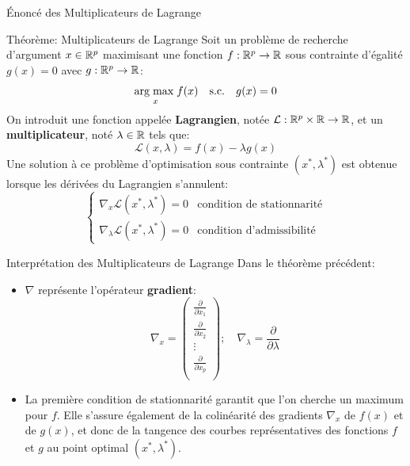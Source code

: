 \begin{frame}{\'Enoncé des Multiplicateurs de Lagrange}
	\begin{block}{Théorème: Multiplicateurs de Lagrange}
		Soit un problème de recherche d'argument $x \in \mathbb{R}^p$ maximisant une fonction $f: \mathbb{R}^p \to \mathbb{R}$ sous contrainte d'égalité $g(x) = 0$ avec $g: \mathbb{R}^p \to \mathbb{R}$:
		\begin{equation}
			\underset{x}{\operatorname{arg\;max}\;}f(x) \quad \text{s.c.} \quad g(x) = 0
			\nonumber
		\end{equation}
		On introduit une fonction appelée \textbf{Lagrangien}, notée $\mathcal{L}: \mathbb{R}^p \times \mathbb{R} \to \mathbb{R}$, et un \textbf{multiplicateur}, noté $\lambda \in \mathbb{R}$ tels que:
		\begin{equation}
			\mathcal{L}(x, \lambda) = f(x) - \lambda g(x)
			\nonumber
		\end{equation}
		Une solution à ce problème d'optimisation sous contrainte $(x^*, \lambda^*)$ est obtenue lorsque les dérivées du Lagrangien s'annulent:
		\begin{equation}
			\begin{cases}
				\nabla_x \mathcal{L}(x^*, \lambda^*) = 0          & \text{condition de stationnarité} \\
				\nabla_{\lambda} \mathcal{L}(x^*, \lambda^*) = 0  & \text{condition d'admissibilité}
				\nonumber
			\end{cases}
		\end{equation}
	\end{block}
\end{frame}

\begin{frame}{Interprétation des Multiplicateurs de Lagrange}
	Dans le théorème précédent:
	\begin{itemize}
		\item $\nabla$ représente l'opérateur \textbf{gradient}:
		\begin{equation}
			\nabla_x = \begin{pmatrix}
				\frac{\partial}{\partial{x_1}} \\
				\frac{\partial}{\partial{x_2}} \\
				\vdots \\
				\frac{\partial}{\partial{x_p}} \\
			\end{pmatrix}; \quad \nabla_{\lambda} = \frac{\partial}{\partial{\lambda}}
			\nonumber
		\end{equation}
		\pause
		\item La première condition de stationnarité garantit que l'on cherche un maximum pour $f$. Elle s'assure également de la colinéarité des gradients $\nabla_x$ de $f(x)$ et de $g(x)$, et donc de la tangence des courbes représentatives des fonctions $f$ et $g$ au point optimal $(x^*, \lambda^*)$.
	\end{itemize}
\end{frame}

